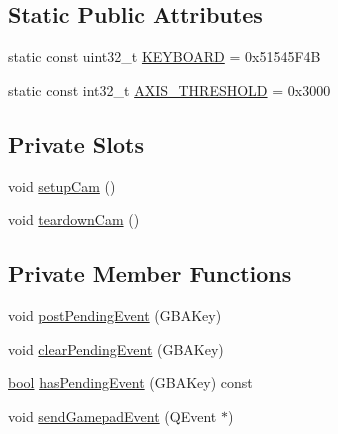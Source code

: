 \subsection*{Static Public Attributes}
\begin{DoxyCompactItemize}
\item 
static const uint32\+\_\+t \mbox{\hyperlink{class_q_g_b_a_1_1_input_controller_aa377085cf008dad0c30903f05c4d72fa}{K\+E\+Y\+B\+O\+A\+RD}} = 0x51545\+F4B
\item 
static const int32\+\_\+t \mbox{\hyperlink{class_q_g_b_a_1_1_input_controller_af8d8296d311a345f44171e3e2023999c}{A\+X\+I\+S\+\_\+\+T\+H\+R\+E\+S\+H\+O\+LD}} = 0x3000
\end{DoxyCompactItemize}
\subsection*{Private Slots}
\begin{DoxyCompactItemize}
\item 
void \mbox{\hyperlink{class_q_g_b_a_1_1_input_controller_a90831694883462971f12d75ce3bfdc30}{setup\+Cam}} ()
\item 
void \mbox{\hyperlink{class_q_g_b_a_1_1_input_controller_ab1edf8a6d6f63d6ad03359668019a573}{teardown\+Cam}} ()
\end{DoxyCompactItemize}
\subsection*{Private Member Functions}
\begin{DoxyCompactItemize}
\item 
void \mbox{\hyperlink{class_q_g_b_a_1_1_input_controller_a6a77a32d50689865c44ac9d0f677cda8}{post\+Pending\+Event}} (G\+B\+A\+Key)
\item 
void \mbox{\hyperlink{class_q_g_b_a_1_1_input_controller_a2fe06ce5ff99d006a7e774c1fbfde1c7}{clear\+Pending\+Event}} (G\+B\+A\+Key)
\item 
\mbox{\hyperlink{libretro_8h_a4a26dcae73fb7e1528214a068aca317e}{bool}} \mbox{\hyperlink{class_q_g_b_a_1_1_input_controller_ac7349ad1b448e3fe77ee981862c7d5d2}{has\+Pending\+Event}} (G\+B\+A\+Key) const
\item 
void \mbox{\hyperlink{class_q_g_b_a_1_1_input_controller_a56d481c42593a40d448bcfd2d385a392}{send\+Gamepad\+Event}} (Q\+Event $\ast$)
\end{DoxyCompactItemize}
